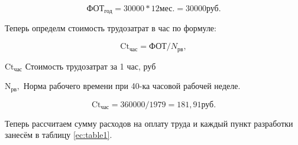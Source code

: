 \begin{equation*}
    \text{ФОТ}_\text{год} = 30 000 * 12 \text{мес.} = 30 000 \text{руб.}
\end{equation*}

Теперь определм стоимость трудозатрат в час по формуле:

\begin{equation}
    \text{Ct}_\text{час} = \text{ФОТ} / N_\text{рв},
\end{equation}

\begin{eqexpl}[5ex]
    \item{$\text{Ct}_\text{час}$} Стоимость трудозатрат за 1 час, руб
    \item{$\text{N}_\text{рв},$} Норма рабочего времени при 40-ка часовой рабочей
неделе.
\end{eqexpl}

\begin{equation*}
    \text{Ct}_\text{час} = 360 000 / 1979 = 181,91 \text{руб}.
\end{equation*}

Теперь рассчитаем сумму расходов на оплату труда и каждый пункт
разработки занесём в таблицу \ref{ec:table1}.


